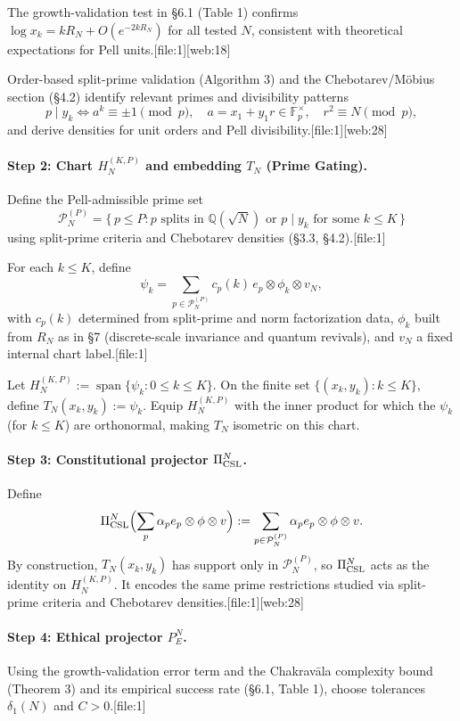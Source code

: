 \documentclass[11pt]{article}
\begin{document}
The growth-validation test in §6.1 (Table 1) confirms
\(\log x_k = k R_N + O(e^{-2kR_N})\) for all tested \(N\), consistent with
theoretical expectations for Pell units.[file:1][web:18]

Order-based split-prime validation (Algorithm 3) and the Chebotarev/M\"obius
section (§4.2) identify relevant primes and divisibility patterns
\[
p \mid y_k \iff a^k \equiv \pm 1 \pmod p,\quad
a = x_1 + y_1 r \in \mathbb{F}_p^\times, \quad r^2 \equiv N \pmod p,
\]
and derive densities for unit orders and Pell divisibility.[file:1][web:28]

\paragraph{Step 2: Chart \(H_N^{(K,P)}\) and embedding \(T_N\) (Prime Gating).}
Define the Pell-admissible prime set
\[
\mathcal{P}_N^{(P)} = \{\, p \le P : p\text{ splits in }\mathbb{Q}(\sqrt{N})
\text{ or } p\mid y_k \text{ for some }k \le K \,\}
\]
using split-prime criteria and Chebotarev densities (§3.3, §4.2).[file:1]

For each \(k \le K\), define
\[
\psi_k = \sum_{p \in \mathcal{P}_N^{(P)}} c_p(k)\, e_p \otimes \phi_k \otimes v_N,
\]
with \(c_p(k)\) determined from split-prime and norm factorization data,
\(\phi_k\) built from \(R_N\) as in §7 (discrete-scale invariance and
quantum revivals), and \(v_N\) a fixed internal chart label.[file:1]

Let \(H_N^{(K,P)} := \operatorname{span}\{\psi_k : 0\le k \le K\}\). On
the finite set \(\{(x_k,y_k) : k \le K\}\), define
\(T_N(x_k,y_k) := \psi_k\). Equip \(H_N^{(K,P)}\) with the inner product
for which the \(\psi_k\) (for \(k\le K\)) are orthonormal, making \(T_N\)
isometric on this chart.

\paragraph{Step 3: Constitutional projector \(\Pi_{\rm CSL}^N\).}
Define
\[
\Pi_{\rm CSL}^N\Bigl(\sum_p \alpha_p e_p \otimes \phi \otimes v\Bigr)
:= \sum_{p \in \mathcal{P}_N^{(P)}} \alpha_p e_p \otimes \phi \otimes v.
\]
By construction, \(T_N(x_k,y_k)\) has support only in
\(\mathcal{P}_N^{(P)}\), so \(\Pi_{\rm CSL}^N\) acts as the identity on
\(H_N^{(K,P)}\). It encodes the same prime restrictions studied via
split-prime criteria and Chebotarev densities.[file:1][web:28]

\paragraph{Step 4: Ethical projector \(P_E^N\).}
Using the growth-validation error term and the Chakrav\=ala complexity
bound (Theorem 3) and its empirical success rate (§6.1, Table 1), choose
tolerances \(\delta_1(N)\) and \(C>0\).[file:1]
\end{document}
